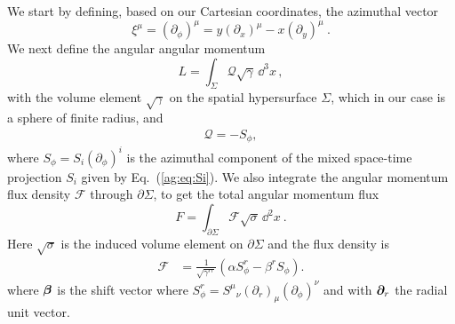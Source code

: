 We start by defining, based on our Cartesian coordinates, the azimuthal vector
\begin{equation}
    {\xi}^\mu = (\partial_{\phi})^\mu = y(\partial_x)^\mu - x (\partial_y)^\mu~.
\end{equation}
We next define the angular angular momentum
\begin{equation}
    \mathbin{{L = \int_{\Sigma} \mathcal{Q} \sqrt{\gamma}\,
    \dd^3x}}\,,
\end{equation}
with the volume element $\sqrt{\gamma}$ on the spatial hypersurface $\Sigma$, which in our case is a sphere of finite radius, and 
\begin{align}   
    \mathcal{Q} = -S_\phi, 
\end{align}
where $S_\phi = S_i (\partial_\phi)^i$ is the azimuthal component of
the mixed space-time projection $S_i$ given by Eq.~(\ref{ag:eq:Si}). 
We also integrate the angular momentum flux density $\mathcal{F}$ through
$\partial \Sigma$, to get the total angular momentum flux
\begin{equation}
    \mathbin{{F = \int_{\partial \Sigma} \mathcal{F} \sqrt{\sigma }\,
    \dd^2x}}~.\label{ag:eqn:DefAngMomFlux}
\end{equation}
Here $\sqrt{\sigma}$ is the induced volume element on $\partial \Sigma$ and the flux density is
\begin{align}
    \mathcal{F} &= \frac{1}{\sqrt{\gamma^{rr}}}\left(\alpha S^r_\phi -\beta^r S_\phi\right).
\end{align}
where $\boldsymbol\beta$ is the shift vector where $S^r_\phi = {S^{\mu}}_{\nu} (\partial_r)_{\mu} (\partial_\phi)^{\nu} $ and with $\boldsymbol{\partial}_{r}$ the radial unit vector.

